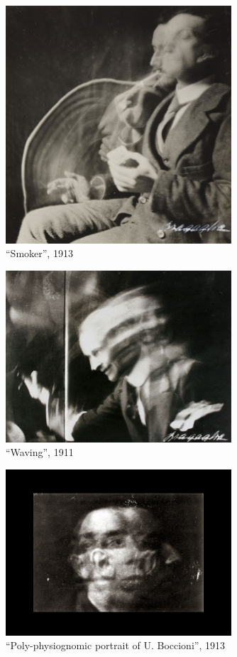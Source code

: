\documentclass[
]{book}
\begin{document}
\begin{figure}
\centering
\includegraphics[width=0.75\textwidth,height=\textheight]{medias/corpus/bragaglia/Anton-Giulio-Bragaglia-fotodinamica-07.jpg}
\caption{``Smoker'', 1913}
\end{figure}

\begin{figure}
\centering
\includegraphics[width=0.75\textwidth,height=\textheight]{medias/corpus/bragaglia/Anton-Giulio-Bragaglia-fotodinamica-08.jpg}
\caption{``Waving'', 1911}
\end{figure}

\begin{figure}
\centering
\includegraphics[width=0.75\textwidth,height=\textheight]{medias/corpus/bragaglia/Anton-Giulio-Bragaglia-fotodinamica-09.jpg}
\caption{``Poly-physiognomic portrait of U. Boccioni'', 1913}
\end{figure}
\end{document}
